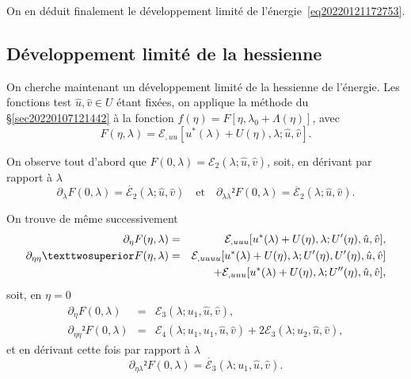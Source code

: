 \documentclass[12pt, final]{amsart}
\begin{document}
On en déduit finalement le développement limité de l'énergie~\eqref{eq20220121172753}.

\subsection{Développement limité de la hessienne}
\label{sec20211115081016}

On cherche maintenant un développement limité de la hessienne de l'énergie. Les
fonctions test \(\hat{u}, \hat{v}\in U\) étant fixées, on applique la méthode du
§\ref{sec20220107121442} à la fonction \(f(\eta )=F[\eta , \lambda _0+\Lambda (\eta )]\), avec
\begin{equation}
  F(\eta , \lambda )=\mathcal E_{,uu}[u^*(\lambda )+U(\eta ), \lambda ; \hat{u}, \hat{v}].
\end{equation}

On observe tout d'abord que \(F(0, \lambda )=\mathcal E_2(\lambda ; \hat{u}, \hat{v})\), soit, en
dérivant par rapport à \(\lambda \)
\begin{equation}
  \partial _\lambda  F(0, \lambda )=\dot{\mathcal E_2}(\lambda ; \hat{u}, \hat{v})
  \quad\text{et}\quad
  \partial _{\lambda \lambda }²F(0, \lambda )=\ddot{\mathcal E_2}(\lambda ; \hat{u}, \hat{v}).
\end{equation}

On trouve de même successivement
\begin{eqnarray}
  \partial _\eta F(\eta , \lambda )&=&\mathcal E_{,uuu}[u^\ast(\lambda )+U(\eta ), \lambda ; U'(\eta ), \hat{u}, \hat{v}],\\
  \notag
  \partial _{\eta \eta }²F(\eta , \lambda )&=&\mathcal E_{,uuuu}[u^\ast(\lambda )+U(\eta ), \lambda ; U'(\eta ), U'(\eta ), \hat{u}, \hat{v}]\\
            &&+\mathcal E_{,uuu}[u^\ast(\lambda )+U(\eta ), \lambda ; U''(\eta ), \hat{u}, \hat{v}],
\end{eqnarray}
soit, en \(\eta =0\)
\begin{eqnarray}
  \partial _\eta F(0, \lambda )&=&\mathcal E_3(\lambda ; u_1, \hat{u}, \hat{v}),\\
  \partial _{\eta \eta }²F(0, \lambda )&=&\mathcal E_4(\lambda ; u_1, u_1, \hat{u}, \hat{v})+2\mathcal E_3(\lambda ; u_2, \hat{u}, \hat{v}),
\end{eqnarray}
et en dérivant cette fois par rapport à \(\lambda \)
\begin{equation}
  \partial _{\eta \lambda }²F(0, \lambda )=\dot{\mathcal E_3}(\lambda ; u_1, \hat{u}, \hat{v}).
\end{equation}
\end{document}
